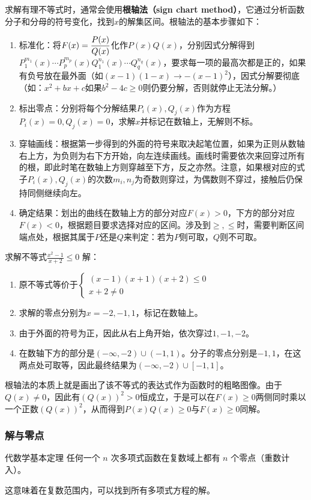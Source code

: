 求解有理不等式时，通常会使用\textbf{根轴法（sign chart method）}，它通过分析函数分子和分母的符号变化，找到$x$的解集区间。根轴法的基本步骤如下：
\begin{enumerate}
\item 标准化：将$\displaystyle F(x)={P(x)\over Q(x)}$化作$P(x)Q(x)$，分别因式分解得到$P^{m_1}_1(x)\cdots P^{m_p}_p(x)Q^{n_1}_1(x)\cdots Q^{n_q}_q(x)$，要求每一项的最高次都是正的，如果有负号放在最外面（如$(x-1)(1-x)\to-(x-1)^2$），因式分解要彻底（如：$x^2+bx+c$如果$b^2-4c\geq0$则仍要分解，否则就停止无法分解。）
\item 标出零点：分别将每个分解结果$P_i(x),Q_j(x)$作为方程$P_i(x)=0,Q_j(x)=0$，求解$x$并标记在数轴上，无解则不标。
\item 穿轴画线：根据第一步得到的外面的符号来取决起笔位置，如果为正则从数轴右上方，为负则为右下方开始，向左连续画线。画线时需要依次来回穿过所有的根，即此时笔在数轴上方则穿越至下方，反之亦然。注意，如果根对应的式子$P_i(x),Q_j(x)$的次数$m_i,n_j$为奇数则穿过，为偶数则不穿过，接触后仍保持同侧继续向左。
\item 确定结果：划出的曲线在数轴上方的部分对应$F(x)>0$，下方的部分对应$F(x)<0$，根据题目要求选择对应的区间。涉及到$\geq,\leq$时，需要判断区间端点处，根据其属于$P$还是$Q$来判定：若为$P$则可取，$Q$则不可取。
\end{enumerate}
\begin{example}{求解不等式$\displaystyle \frac{x^2 - 1}{x + 2} \leq 0$}
解：
\begin{enumerate}
\item 原不等式等价于$\begin{cases}(x-1)(x+1)(x+2)\leq0 \\ x+2\neq0\end{cases}$
\item 求解的零点分别为$x=-2,-1,1$，标记在数轴上。
\item 由于外面的符号为正，因此从右上角开始，依次穿过$1,-1,-2$。
\item 在数轴下方的部分是$(-\infty,-2)\cup(-1,1)$。分子的零点分别是$-1,1$，在这两点处可取等，因此最终结果为$(-\infty,-2)\cup[-1,1]$。
\end{enumerate}
\end{example}

根轴法的本质上就是画出了该不等式的表达式作为函数时的粗略图像。由于$Q(x)\neq0$，因此有$\left(Q(x)\right)^2>0$恒成立，于是可以在$F(x) \geq 0$两侧同时乘以一个正数$\left(Q(x)\right)^2$，从而得到$P(x)Q(x)\geq0$与$F(x) \geq 0$同解。

\subsubsection{解与零点}

\begin{definition}{代数学基本定理}
任何一个 $n$ 次多项式函数在复数域上都有 $n$ 个零点（重数计入）。
\end{definition}
这意味着在复数范围内，可以找到所有多项式方程的解。



